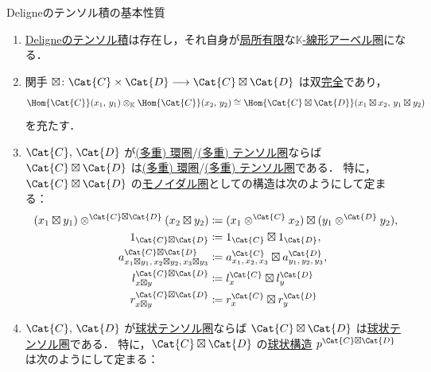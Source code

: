 \documentclass[TQFT_main]{subfiles}
\begin{document}
\begin{myprop}[label=prop:DeligneProduct]{Deligneのテンソル積の基本性質}
    \begin{enumerate}
        \item \hyperref[def:DeligneProduct]{Deligneのテンソル積}は存在し，それ自身が\hyperref[def:finite-abcat]{局所有限}な\hyperref[def:additive-cat]{$\mathbb{K}$-線形アーベル圏}になる．
        \item 関手 $\boxtimes \colon \Cat{C} \times \Cat{D} \lto \Cat{C} \boxtimes \Cat{D}$ は双\hyperref[def:additive-exact]{完全}であり，
        \begin{align}
            \Hom{\Cat{C}} (x_1,\, y_1) \otimes_{\mathbb{K}} \Hom{\Cat{C}} (x_2,\, y_2) \cong \Hom{\Cat{C} \boxtimes \Cat{D}} (x_1 \boxtimes x_2,\, y_1 \boxtimes y_2)
        \end{align}
        を充たす．
        \item $\Cat{C},\, \Cat{D}$ が\hyperref[def:ringcat]{(多重) 環圏}/\hyperref[def:tensorfusion-cat]{(多重) テンソル圏}ならば $\Cat{C} \boxtimes \Cat{D}$ は\hyperref[def:ringcat]{(多重) 環圏}/\hyperref[def:tensorfusion-cat]{(多重) テンソル圏}である．
            特に，$\Cat{C} \boxtimes \Cat{D}$ の\hyperref[redef:monoidal-category]{モノイダル圏}としての構造は次のようにして定まる：
            \begin{align}
                (x_1 \boxtimes y_1) \otimes^{\Cat{C} \boxtimes \Cat{D}} (x_2 \boxtimes y_2) &\coloneqq (x_1 \otimes^{\Cat{C}} x_2) \boxtimes (y_1 \otimes^{\Cat{D}} y_2), \\
                1_{\Cat{C} \boxtimes \Cat{D}} &\coloneqq 1_{\Cat{C}} \boxtimes 1_{\Cat{D}}, \\
                a^{\Cat{C} \boxtimes \Cat{D}}_{x_1 \boxtimes y_1,\, x_2 \boxtimes y_2,\, x_3 \boxtimes y_3} &\coloneqq a^{\Cat{C}}_{x_1,\, x_2,\, x_3} \boxtimes a^{\Cat{D}}_{y_1,\, y_2,\, y_3}, \\
                l^{\Cat{C} \boxtimes \Cat{D}}_{x \boxtimes y} &\coloneqq l^{\Cat{C}}_x \boxtimes l^{\Cat{D}}_y \\
                r^{\Cat{C} \boxtimes \Cat{D}}_{x \boxtimes y} &\coloneqq r^{\Cat{C}}_x \boxtimes r^{\Cat{D}}_y
            \end{align}
        \item $\Cat{C},\, \Cat{D}$ が\hyperref[def:spherical]{球状}\hyperref[def:tensorfusion-cat]{テンソル圏}ならば $\Cat{C} \boxtimes \Cat{D}$ は\hyperref[def:spherical]{球状}\hyperref[def:tensorfusion-cat]{テンソル圏}である．
            特に，$\Cat{C} \boxtimes \Cat{D}$ の\hyperref[def:spherical]{球状構造} $p^{\Cat{C} \boxtimes \Cat{D}}$ は次のようにして定まる：

\end{enumerate}
\end{myprop}
\end{document}
